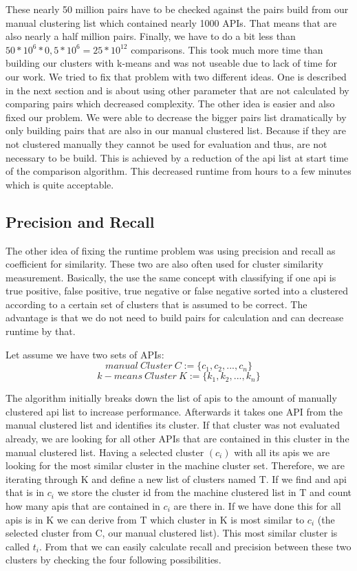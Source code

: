 \documentclass[a4paper]{IEEEtran}
\begin{document}
These nearly 50 million pairs have to be checked against the pairs build from our manual clustering list which contained nearly 1000 APIs. That means that are also nearly a half million pairs. Finally, we have to do a bit less than $50*10^6*0,5*10^6=25*10^{12}$ comparisons. This took much more time than building our clusters with k-means and was not useable due to lack of time for our work.
We tried to fix that problem with two different ideas. One is described in the next section and is about using other parameter that are not calculated by comparing pairs which decreased complexity. The other idea is easier and also fixed our problem. We were able to decrease the bigger pairs list dramatically by only building pairs that are also in our manual clustered list. Because if they are not clustered manually they cannot be used for evaluation and thus, are not necessary to be build. This is achieved by a reduction of the api list at start time of the comparison algorithm. This decreased runtime from hours to a few minutes which is quite acceptable.

\subsection{Precision and Recall}
The other idea of fixing the runtime problem was using precision and recall as coefficient for similarity. These two are also often used for cluster similarity measurement. Basically, the use the same concept with classifying if one api is true positive, false positive, true negative or false negative sorted into a clustered according to a certain set of clusters that is assumed to be correct. The advantage is that we do not need to build pairs for calculation and can decrease runtime by that. \cite{powers2011evaluation}

Let assume we have two sets of APIs:
\begin{equation*}
manual~Cluster~C := \{ c_1,c_2,...,c_n \}
\end{equation*}
\begin{equation*}
k-means~Cluster~K := \{ k_1,k_2,...,k_n \}
\end{equation*}

The algorithm initially breaks down the list of apis to the amount of manually clustered api list to increase performance. 
Afterwards it takes one API from the manual clustered list and identifies its cluster. If that cluster was not evaluated already, we are looking for all other APIs that are contained in this cluster in the manual clustered list. Having a selected cluster $(c_i)$ with all its apis we are looking for the most similar cluster in the machine cluster set. Therefore, we are iterating through K and define a new list of clusters named T. If we find and api that is in $c_i$ we store the cluster id from the machine clustered list in T and count how many apis that are contained in $c_i$ are there in. If we have done this for all apis is in K we can derive from T which cluster in K is most similar to $c_i$ (the selected cluster from C, our manual clustered list). This most similar cluster is called $t_i$. From that we can easily calculate recall and precision between these two clusters by checking the four following possibilities.
\end{document}
